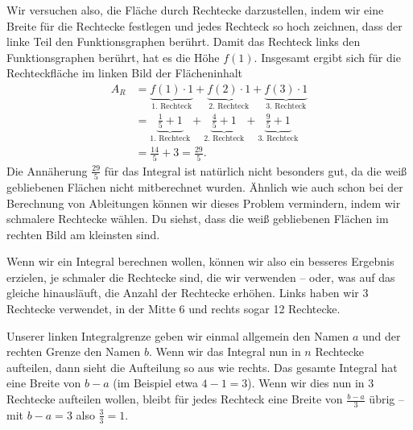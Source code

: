 \documentclass[../../main.tex]{subfiles}
\begin{document}
Wir versuchen also, die Fläche durch Rechtecke darzustellen, indem wir eine Breite für die Rechtecke festlegen und jedes 
Rechteck so hoch zeichnen, dass der linke Teil den Funktionsgraphen berührt. Damit das Rechteck links den Funktionsgraphen
berührt, hat es die Höhe $f(1)$. Insgesamt ergibt sich für die Rechteckfläche im linken Bild der Flächeninhalt
\begin{align*}
    A_R&=\underbrace{f(1)\cdot 1}_{\text{1. Rechteck}}+\underbrace{f(2)\cdot 1}_{\text{2. Rechteck}}+\underbrace{f(3)\cdot 1}_{\text{3. Rechteck}}\\
    &=\underbrace{\frac{1}{5}+1}_{\text{1. Rechteck}}+\underbrace{\frac{4}{5}+1}_{\text{2. Rechteck}}+\underbrace{\frac{9}{5}+1}_{\text{3. Rechteck}}\\
    &=\frac{14}{5}+3=\frac{29}{5}.
\end{align*}
Die Annäherung $\frac{29}{5}$ für das Integral ist natürlich nicht besonders gut, da die weiß gebliebenen Flächen nicht 
mitberechnet wurden. Ähnlich wie auch schon bei der Berechnung von Ableitungen können wir dieses Problem vermindern,
indem wir schmalere Rechtecke wählen. Du siehst, dass die weiß gebliebenen Flächen im rechten Bild am kleinsten sind.

Wenn wir ein Integral berechnen wollen, können wir also ein besseres Ergebnis erzielen, je schmaler die Rechtecke sind,
die wir verwenden -- oder, was auf das gleiche hinausläuft, die Anzahl der Rechtecke erhöhen. Links haben wir 3 Rechtecke
verwendet, in der Mitte 6 und rechts sogar 12 Rechtecke.

Unserer linken Integralgrenze geben wir einmal allgemein den Namen $a$ und der rechten Grenze den Namen $b$. Wenn wir
das Integral nun in $n$ Rechtecke aufteilen, dann sieht die Aufteilung so aus wie rechts. Das gesamte Integral hat eine
Breite von $b-a$ (im Beispiel etwa $4-1=3$). Wenn wir dies nun in 3 Rechtecke aufteilen wollen, bleibt für jedes Rechteck
eine Breite von $\frac{b-a}{3}$ übrig -- mit $b-a=3$ also $\frac{3}{3}=1$.
\end{document}

